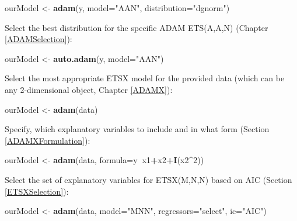 \documentclass[]{book}
\newenvironment{Shaded}{\begin{snugshade}}{\end{snugshade}}
\newcommand{\DataTypeTok}[1]{\textcolor[rgb]{0.13,0.29,0.53}{#1}}
\newcommand{\DecValTok}[1]{\textcolor[rgb]{0.00,0.00,0.81}{#1}}
\newcommand{\KeywordTok}[1]{\textcolor[rgb]{0.13,0.29,0.53}{\textbf{#1}}}
\newcommand{\NormalTok}[1]{#1}
\newcommand{\OperatorTok}[1]{\textcolor[rgb]{0.81,0.36,0.00}{\textbf{#1}}}
\newcommand{\StringTok}[1]{\textcolor[rgb]{0.31,0.60,0.02}{#1}}
\theoremstyle{definition}
\theoremstyle{definition}
\theoremstyle{definition}
\theoremstyle{definition}
\theoremstyle{remark}
\begin{document}
\begin{Shaded}
\begin{Highlighting}[]
\NormalTok{ourModel <-}\StringTok{ }\KeywordTok{adam}\NormalTok{(y, }\DataTypeTok{model=}\StringTok{"AAN"}\NormalTok{, }\DataTypeTok{distribution=}\StringTok{"dgnorm"}\NormalTok{)}
\end{Highlighting}
\end{Shaded}

Select the best distribution for the specific ADAM ETS(A,A,N) (Chapter \ref{ADAMSelection}):

\begin{Shaded}
\begin{Highlighting}[]
\NormalTok{ourModel <-}\StringTok{ }\KeywordTok{auto.adam}\NormalTok{(y, }\DataTypeTok{model=}\StringTok{"AAN"}\NormalTok{)}
\end{Highlighting}
\end{Shaded}

Select the most appropriate ETSX model for the provided data (which can be any 2-dimensional object, Chapter \ref{ADAMX}):

\begin{Shaded}
\begin{Highlighting}[]
\NormalTok{ourModel <-}\StringTok{ }\KeywordTok{adam}\NormalTok{(data)}
\end{Highlighting}
\end{Shaded}

Specify, which explanatory variables to include and in what form (Section \ref{ADAMXFormulation}):

\begin{Shaded}
\begin{Highlighting}[]
\NormalTok{ourModel <-}\StringTok{ }\KeywordTok{adam}\NormalTok{(data, }\DataTypeTok{formula=}\NormalTok{y}\OperatorTok{~}\NormalTok{x1}\OperatorTok{+}\NormalTok{x2}\OperatorTok{+}\KeywordTok{I}\NormalTok{(x2}\OperatorTok{^}\DecValTok{2}\NormalTok{))}
\end{Highlighting}
\end{Shaded}

Select the set of explanatory variables for ETSX(M,N,N) based on AIC (Section \ref{ETSXSelection}):

\begin{Shaded}
\begin{Highlighting}[]
\NormalTok{ourModel <-}\StringTok{ }\KeywordTok{adam}\NormalTok{(data, }\DataTypeTok{model=}\StringTok{"MNN"}\NormalTok{,}
                 \DataTypeTok{regressors=}\StringTok{"select"}\NormalTok{, }\DataTypeTok{ic=}\StringTok{"AIC"}\NormalTok{)}
\end{Highlighting}
\end{Shaded}
\end{document}
